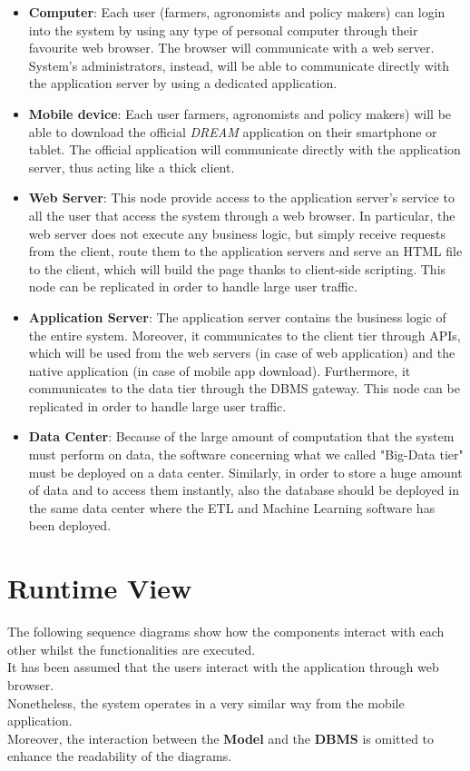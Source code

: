 \documentclass[10pt]{report}
\begin{document}
\begin{itemize}
    \item \textbf{Computer}: Each user (farmers, agronomists and policy makers) can login into the system by using any type of personal computer through their favourite web browser. The browser will communicate with a web server.\\ System's administrators, instead, will be able to communicate directly with the application server by using a dedicated application.
    \item \textbf{Mobile device}: Each user farmers, agronomists and policy makers) will be able to download the official \emph{DREAM} application on their smartphone or tablet. The official application will communicate directly with the application server, thus acting like a thick client.
    \item \textbf{Web Server}: This node provide access to the application server's service to all the user that access the system through a web browser. In particular, the web server does not execute any business logic, but simply receive requests from the client, route them to the application servers and serve an HTML file to the client, which will build the page thanks to client-side scripting. This node can be replicated in order to handle large user traffic.
    \item \textbf{Application Server}: The application server contains the business logic of the entire system. Moreover, it communicates to the client tier through APIs, which will be used from the web servers (in case of web application) and the native application (in case of mobile app download). Furthermore, it communicates to the data tier through the DBMS gateway. This node can be replicated in order to handle large user traffic.
    \item \textbf{Data Center}: Because of the large amount of computation that the system must perform on data, the software concerning what we called "Big-Data tier" must be deployed on a data center. Similarly, in order to store a huge amount of data and to access them instantly, also the database should be deployed in the same data center where the ETL and Machine Learning software has been deployed.
\end{itemize}
\section{Runtime View}
The following sequence diagrams show how the components interact with each other whilst the functionalities
are executed.\\It has been assumed that the users interact with the application through web browser.\\
Nonetheless, the system operates in a very similar way from the mobile application. 
\\ Moreover, the interaction between the \textbf{Model} and the \textbf{DBMS} is omitted to enhance the readability of the diagrams. 
\end{document}

